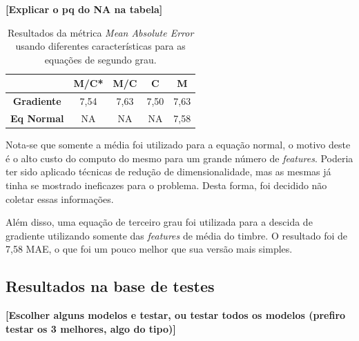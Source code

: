 \documentclass[conference]{IEEEtran}
\begin{document}
\textbf{[Explicar o pq do NA na tabela]}

\begin{table}[!h]
	\centering
	
	\begin{tabular}{ccccc} \\ \hline
		\backslashbox{\textbf{Modelos}}{\textbf{Features}} & \textbf{M/C*} & \textbf{M/C} & \textbf{C} & \textbf{M} \\ \hline
		\textbf{Gradiente}      & 7,54     & 7,63         & 7,50       & 7,63  \\  
		\textbf{Eq Normal}      & NA       & NA         & NA       & 7,58   
	\end{tabular}
	\caption{Resultados da métrica \textit{Mean Absolute Error} usando diferentes características para as equações de segundo grau.}
	\label{tab:comp}
\end{table}

Nota-se que somente a média foi utilizado para a equação normal, o motivo deste é o alto custo do computo do mesmo para um grande número de \emph{features}. Poderia ter sido aplicado técnicas de redução de dimensionalidade, mas as mesmas já tinha se mostrado ineficazes para o problema. Desta forma, foi decidido não coletar essas informações.

Além disso, uma equação de terceiro grau foi utilizada para a descida de gradiente utilizando somente das \emph{features} de média do timbre. O resultado foi de 7,58 MAE, o que foi um pouco melhor que sua versão mais simples.

\subsection{Resultados na base de testes }

\textbf{[Escolher alguns modelos e testar, ou testar todos os modelos (prefiro testar os 3 melhores, algo do tipo)]}


\end{document}
